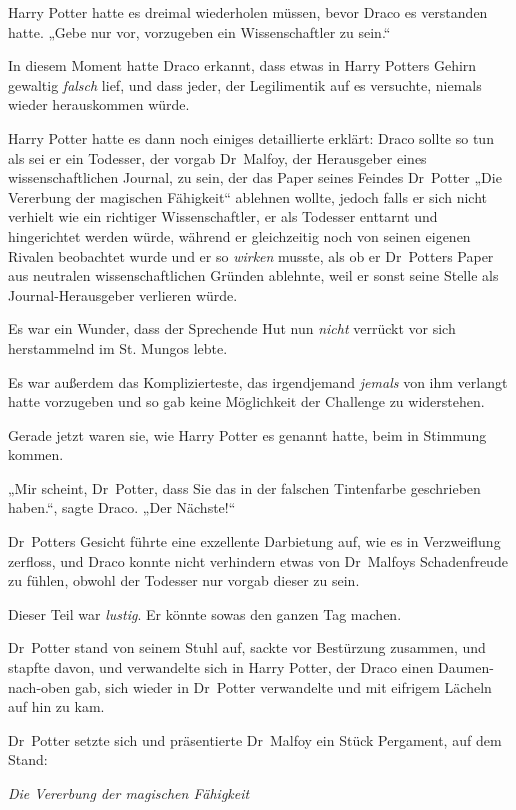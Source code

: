 {Harry Potter hatte es dreimal wiederholen müssen, bevor Draco es verstanden hatte. „Gebe nur vor, vorzugeben ein Wissenschaftler zu sein.“

In diesem Moment hatte Draco erkannt, dass etwas in Harry Potters Gehirn gewaltig \emph{falsch} lief, und dass jeder, der Legilimentik auf es versuchte, niemals wieder herauskommen würde.

Harry Potter hatte es dann noch einiges detaillierte erklärt: Draco sollte so tun als sei er ein Todesser, der vorgab Dr~Malfoy, der Herausgeber eines wissenschaftlichen Journal, zu sein, der das Paper seines Feindes Dr~Potter „Die Vererbung der magischen Fähigkeit“ ablehnen wollte, jedoch falls er sich nicht verhielt wie ein richtiger Wissenschaftler, er als Todesser enttarnt und hingerichtet werden würde, während er gleichzeitig noch von seinen eigenen Rivalen beobachtet wurde und er so \emph{wirken} musste, als ob er Dr~Potters Paper aus neutralen wissenschaftlichen Gründen ablehnte, weil er sonst seine Stelle als Journal-Herausgeber verlieren würde.

Es war ein Wunder, dass der Sprechende Hut nun \emph{nicht} verrückt vor sich herstammelnd im St. Mungos lebte.

Es war außerdem das Komplizierteste, das irgendjemand \emph{jemals} von ihm verlangt hatte vorzugeben und so gab keine Möglichkeit der Challenge zu widerstehen.

Gerade jetzt waren sie, wie Harry Potter es genannt hatte, beim in Stimmung kommen.

„Mir scheint, Dr~Potter, dass Sie das in der falschen Tintenfarbe geschrieben haben.“, sagte Draco. „Der Nächste!“

Dr~Potters Gesicht führte eine exzellente Darbietung auf, wie es in Verzweiflung zerfloss, und Draco konnte nicht verhindern etwas von Dr~Malfoys Schadenfreude zu fühlen, obwohl der Todesser nur vorgab dieser zu sein.

Dieser Teil war \emph{lustig}. Er könnte sowas den ganzen Tag machen.

Dr~Potter stand von seinem Stuhl auf, sackte vor Bestürzung zusammen, und stapfte davon, und verwandelte sich in Harry Potter, der Draco einen Daumen-nach-oben gab, sich wieder in Dr~Potter verwandelte und mit eifrigem Lächeln auf hin zu kam.

Dr~Potter setzte sich und präsentierte Dr~Malfoy ein Stück Pergament, auf dem Stand:

\emph{Die Vererbung der magischen Fähigkeit}

}
